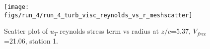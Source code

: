 \begin{figure}[H]
\centering
\texttt{[image: figs/run\_4/run\_4\_turb\_visc\_reynolds\_vs\_r\_meshscatter]}
\caption{Scatter plot of $
u_T$ reynolds stress term vs radius at $z/c$=5.37, $V_{free}$=21.06, station 1.}
\label{fig:run_4_turb_visc_reynolds_vs_r_meshscatter}
\end{figure}


